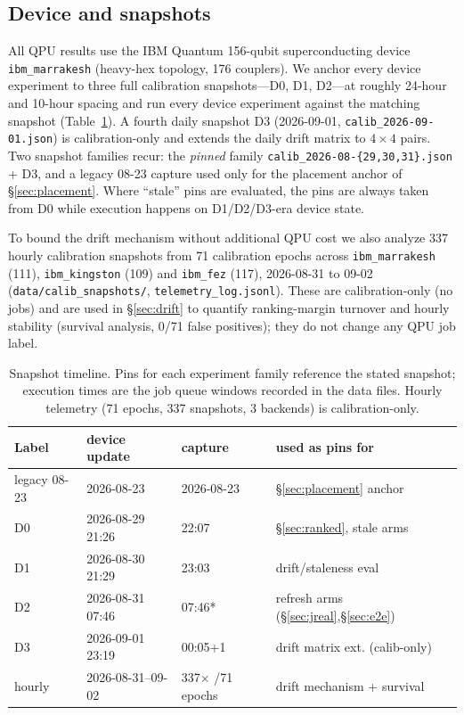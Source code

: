 \documentclass[journal,10pt,twocolumn]{IEEEtran}
\begin{document}
\subsection{Device and snapshots}
All QPU results use the IBM Quantum 156-qubit superconducting device \texttt{ibm\_marrakesh} (heavy-hex
topology, 176 couplers). We anchor every device experiment to three full calibration snapshots---D0, D1,
D2---at roughly 24-hour and 10-hour spacing and run every device experiment against the matching
snapshot (Table~\ref{tab:snap}). A fourth daily snapshot D3 (2026-09-01, \texttt{calib\_2026-09-01.json})
is calibration-only and extends the daily drift matrix to $4\times4$ pairs. Two snapshot families recur:
the \emph{pinned} family \texttt{calib\_2026-08-\{29,30,31\}.json} + D3, and a legacy 08-23 capture used only for the placement
anchor of \S\ref{sec:placement}. Where ``stale'' pins are evaluated, the pins are always taken from
D0 while execution happens on D1/D2/D3-era device state.

To bound the drift mechanism without additional QPU cost we also analyze 337 hourly calibration
snapshots from 71 calibration epochs across \texttt{ibm\_marrakesh} (111), \texttt{ibm\_kingston} (109) and
\texttt{ibm\_fez} (117), 2026-08-31 to 09-02 (\texttt{data/calib\_snapshots/}, \texttt{telemetry\_log.jsonl}).
These are calibration-only (no jobs) and are used in \S\ref{sec:drift} to quantify ranking-margin turnover and hourly
stability (survival analysis, 0/71 false positives); they do not change any QPU job label.

\begin{table}[t]
\caption{Snapshot timeline. Pins for each experiment family reference the stated snapshot; execution times are the job
queue windows recorded in the data files. Hourly telemetry (71 epochs, 337 snapshots, 3 backends) is calibration-only.}
\label{tab:snap}
\centering
\footnotesize
\setlength{\tabcolsep}{4pt}
\begin{tabular}{@{}lllp{2.9cm}@{}}
\toprule
Label & device update & capture & used as pins for\\
\midrule
legacy 08-23 & 2026-08-23 & 2026-08-23 & \S\ref{sec:placement} anchor\\
D0 & 2026-08-29 21:26 & 22:07 & \S\ref{sec:ranked}, stale arms\\
D1 & 2026-08-30 21:29 & 23:03 & drift/staleness eval\\
D2 & 2026-08-31 07:46 & 07:46* & refresh arms (\S\ref{sec:jreal},\S\ref{sec:e2e})\\
D3 & 2026-09-01 23:19 & 00:05+1 & drift matrix ext. (calib-only)\\
hourly & 2026-08-31--09-02 & 337$\times$ /71 epochs & drift mechanism + survival\\
\bottomrule
\end{tabular}
\end{table}
\end{document}
